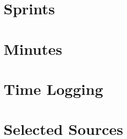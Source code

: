 \begin{appendix}

\chapter{Sprints}

\chapter{Minutes}

\chapter{Time Logging}

\chapter{Selected Sources}

\end{appendix}
